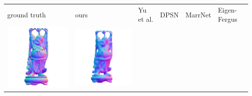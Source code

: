 \begin{center}
\begin{tabularx}{\linewidth}{@{}Y@{}Y@{}Y@{}Y@{}Y@{}Y@{}}
ground truth & ours & Yu et al. & DPSN & MarrNet & Eigen-Fergus \\
\includegraphics[width=\linewidth]{semisynthetic/20150514_20_gt.png} &
\includegraphics[width=\linewidth]{semisynthetic/20150514_20_ours_out.png} &

\end{tabularx}
\end{center}
